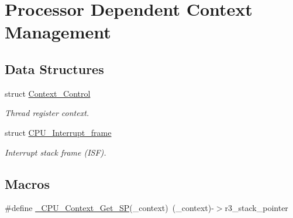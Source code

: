 \hypertarget{group__RTEMSScoreCPUV850CPUContext}{}\section{Processor Dependent Context Management}
\label{group__RTEMSScoreCPUV850CPUContext}
\subsection*{Data Structures}
\begin{DoxyCompactItemize}
\item 
struct \mbox{\hyperlink{structContext__Control}{Context\+\_\+\+Control}}
\begin{DoxyCompactList}\small\item\em Thread register context. \end{DoxyCompactList}\item 
struct \mbox{\hyperlink{structCPU__Interrupt__frame}{C\+P\+U\+\_\+\+Interrupt\+\_\+frame}}
\begin{DoxyCompactList}\small\item\em Interrupt stack frame (I\+SF). \end{DoxyCompactList}\end{DoxyCompactItemize}
\subsection*{Macros}
\begin{DoxyCompactItemize}
\item 
\#define \mbox{\hyperlink{group__RTEMSScoreCPUV850CPUContext_ga896055157b72692a6141f7c0039eabdf}{\+\_\+\+C\+P\+U\+\_\+\+Context\+\_\+\+Get\+\_\+\+SP}}(\+\_\+context)~(\+\_\+context)-\/$>$r3\+\_\+stack\+\_\+pointer
\end{DoxyCompactItemize}
